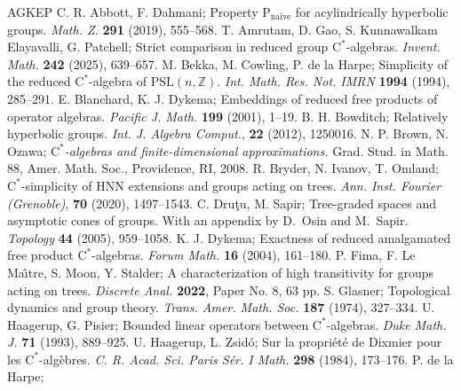 \documentclass[12pt,nosumlimits,nonamelimits]{amsart}
\theoremstyle{remark}
\theoremstyle{definition}
\begin{document}
\begin{thebibliography}{AGKEP}
%
 C. R. Abbott, F. Dahmani;
Property $\mathrm{P}_{\mathrm{naive}}$ for acylindrically hyperbolic groups.
\emph{Math. Z.} \textbf{291} (2019), 555--568.
%
 T. Amrutam, D. Gao, S. Kunnawalkam Elayavalli, G. Patchell;
Strict comparison in reduced group $\mathrm{C}^*$-alge\-bras. 
\emph{Invent. Math.} \textbf{242} (2025), 639--657.
%
%
 M. Bekka, M. Cowling, P. de la Harpe; 
Simplicity of the reduced $\mathrm{C}^*$-algebra of $\mathrm{PSL}(n,\mathbb{Z})$. 
\emph{Int. Math. Res. Not. IMRN} \textbf{1994} (1994), 285--291.
%
 E. Blanchard, K. J. Dykema; 
Embeddings of reduced free products of operator algebras. 
\emph{Pacific J. Math.} \textbf{199} (2001), 1--19.
%
 B. H. Bowditch; 
Relatively hyperbolic groups. 
\emph{Int. J. Algebra Comput.}, \textbf{22} (2012), 1250016.
%
  N. P. Brown, N. Ozawa; 
\emph{$\mathrm{C}^*$-alge\-bras and finite-dimensional approximations.} 
Grad. Stud. in Math. 88, Amer. Math. Soc., Providence, RI, 2008. 
%
 R. Bryder, N. Ivanov, T. Omland; 
$\mathrm{C}^*$-simplicity of HNN extensions and groups acting on trees. 
\emph{Ann. Inst. Fourier (Grenoble)}, \textbf{70} (2020), 1497--1543.
%
  C. Dru\c{t}u, M. Sapir; 
Tree-graded spaces and asymptotic cones of groups. 
With an appendix by D.~Osin and M.~Sapir. 
\emph{Topology} \textbf{44} (2005), 959--1058. 
%
 K. J. Dykema;
Exactness of reduced amalgamated free product $\mathrm{C}^*$-alge\-bras. 
\emph{Forum Math.} \textbf{16} (2004), 161--180.
%
 P. Fima,  F. Le Ma\^{\i}tre, S. Moon, Y. Stalder;
A characterization of high transitivity for groups acting on trees.
\emph{Discrete Anal.} \textbf{2022}, Paper No. 8, 63 pp.
%
 S. Glasner;
Topological dynamics and group theory.
\emph{Trans. Amer. Math. Soc.} \textbf{187} (1974), 327--334.
%
 U. Haagerup, G. Pisier; 
Bounded linear operators between $\mathrm{C}^*$-alge\-bras. 
\emph{Duke Math. J.} \textbf{71} (1993), 889--925.
%
 U. Haagerup, L. Zsid\'{o}; 
Sur la propri\'{e}t\'{e} de Dixmier pour les $\mathrm{C}^*$-alg\`{e}bres. 
\emph{C. R. Acad. Sci. Paris S\'{e}r. I Math.} \textbf{298} (1984), 173–176.
%
 P. de la Harpe;

\end{thebibliography}
\end{document}

